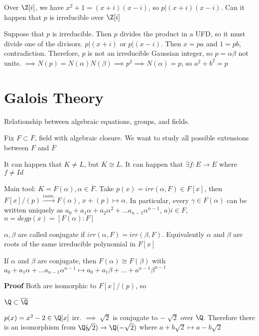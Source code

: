 \documentclass[10pt]{article}
\begin{document}
Over $\Z[i]$, we have $x^2 + 1 = (x + i)(x - i)$, so $p | (x + i)(x - i)$. Can it happen that $p$ is irreducible over $\Z[i]$

Suppose that $p$ is irreducible. Then $p$ divides the product in a UFD, so it must divide one of the divisors. $p | (x + i)$ or $p | (x - i)$. Then $x = pa$ and $1 = pb$, contradiction. Therefore, $p$ is not an irreducible Gaussian integer, so $p = \alpha\beta$ not units. $\implies N(p) = N(\alpha)N(\beta) \implies p^2 \implies N(\alpha) = p$, so $a^2 + b^2 = p$

\section{Galois Theory}
Relationship between algebraic equations, groups, and fields. 

Fix $F \subset \overline{F}$, field with algebraic closure. We want to study all possible extensions between $F$ and $\overline{F}$


It can happen that $K \neq L$, but $K \cong L$. It can happen that $\exists f: E \to E$ where $f \neq Id$

Main tool: $K = F(\alpha), \alpha \in \overline{F}$. Take $p(x) = irr(\alpha, F) \in F[x]$, then $F[x]/(p) \xrightarrow{isom.} F(\alpha)$, $x + (p) \mapsto \alpha$. In particular, every $\gamma \in F(\alpha)$ can be written uniquely as $a_0 + a_1 \alpha + a_2 \alpha^2 + \ldots a_{n-1}\alpha^{n-1}$, $a)i \in F$, $n = deg p(x) = [F(\alpha) : F]$

\begin{defn}
    $\alpha, \beta$ are called conjugate if $irr(\alpha, F) = irr(\beta, F)$. Equivalently $\alpha$ and $\beta$ are roots of the same irreducible polynomial in $F[x]$
\end{defn}
\begin{cor}
    If $\alpha$ and $\beta$ are conjugate, then $F(\alpha) \cong F(\beta)$ with $a_0 + a_1 \alpha + \ldots a_{n-1}\alpha^{n-1} \mapsto a_0 + a_1\beta + \ldots + a^{n-1}\beta^{n-1}$
\end{cor}
\textbf{Proof} Both are isomorphic to $F[x]/(p)$, so 

\begin{exm*}
    $\Q \subset \overline{\Q}$
\end{exm*}
$p(x) = x^2 - 2 \in \Q[x]$ irr. $\implies \sqrt[]{2}$ is conjugate to $-\sqrt[]{2}$ over $\Q$. Therefore there is an isomorphism from $\Q(\sqrt[]{2}) \to \Q(-\sqrt{2})$ where $a + b\sqrt{2} \mapsto a - b\sqrt{2}$
\end{document}
